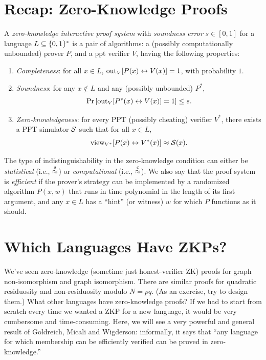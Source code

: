 \documentclass[11pt]{article}
\begin{document}
\thispagestyle{fancy}           %


\section{Recap: Zero-Knowledge Proofs}
\label{sec:recap:zkp}

\begin{definition}
  \label{def:ips}
  A \emph{zero-knowledge interactive proof system} with
  \emph{soundness error} $s \in [0,1]$ for a language $L \subseteq
  \{0,1\}^{*}$ is a pair of algorithms: a (possibly computationally
  unbounded) prover $P$, and a ppt verifier $V$, having the following
  properties:
  \begin{enumerate}
  \item \emph{Completeness}: for all $x \in L$, $\text{out}_{V}[ P(x)
    \leftrightarrow V(x) ] = 1$, with probability $1$.
  \item \emph{Soundness}: for any $x \not\in L$ and any (possibly
    unbounded) $P^{*}$,
    \[ \Pr\left[ \text{out}_{V}[ P^{*}(x) \leftrightarrow V(x) ] = 1 \right]
    \leq s. \]
  \item \emph{Zero-knowledgeness}: for every PPT (possibly cheating)
    verifier $V^{*}$, there exists a PPT simulator $\mathcal{S}$ such that
    for all $x \in L$, \[ \text{view}_{V^{*}}[P(x) \leftrightarrow V^{*}(x)]
    \approx \mathcal{S}(x). \]
  \end{enumerate}

  The type of indistinguishability in the zero-knowledge condition can
  either be \emph{statistical} (i.e., $\stackrel{s}{\approx}$) or
  \emph{computational} (i.e., $\stackrel{c}{\approx}$).  We also say that the proof
  system is \emph{efficient} if the prover's strategy can be
  implemented by a randomized algorithm $P(x,w)$ that runs in time
  polynomial in the length of its first argument, and any $x \in L$
  has a ``hint'' (or witness) $w$ for which $P$ functions as it
  should.
\end{definition}

\section{Which Languages Have ZKPs?}
\label{sec:which-languages-zkp}

We've seen zero-knowledge (sometime just honest-verifier ZK) proofs
for graph non-isomorphism and graph isomorphism.  There are similar
proofs for quadratic residuosity and non-residuosity modulo $N=pq$.
(As an exercise, try to design them.)  What other languages have
zero-knowledge proofs?  If we had to start from scratch every time we
wanted a ZKP for a new language, it would be very cumbersome and
time-consuming.  Here, we will see a very powerful and general result
of Goldreich, Micali and Wigderson: informally, it says that ``any
language for which membership can be efficiently verified can be
proved in zero-knowledge.''
\end{document}
